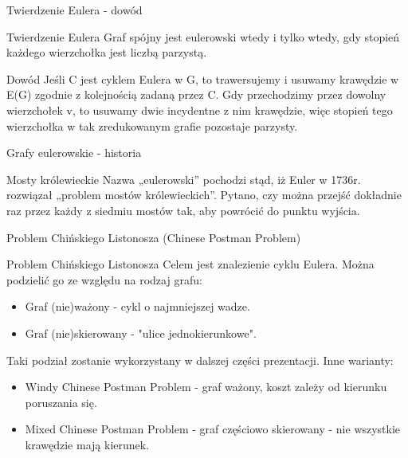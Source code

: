 \documentclass[polish,envcountsect,10pt]{beamer}
\begin{document}
\begin{frame}{Twierdzenie Eulera - dowód}
\begin{block}{Twierdzenie Eulera}
    Graf spójny jest eulerowski wtedy i tylko wtedy, gdy
    stopień każdego wierzchołka jest liczbą parzystą.
\end{block}
\begin{block}{Dowód}
    Jeśli C jest cyklem Eulera w G, to trawersujemy i usuwamy
    krawędzie w E(G) zgodnie z kolejnością zadaną przez C. Gdy przechodzimy
    przez dowolny wierzchołek v, to usuwamy dwie incydentne z nim krawędzie,
    więc stopień tego wierzchołka w tak zredukowanym grafie pozostaje
    parzysty.
\end{block}
\end{frame}

\begin{frame}{Grafy eulerowskie - historia}
    \begin{block}{Mosty królewieckie}
        Nazwa „eulerowski” pochodzi stąd, iż Euler w 1736r. rozwiązał „problem
        mostów królewieckich”. Pytano, czy można przejść dokładnie raz przez
        każdy z siedmiu mostów tak, aby powrócić do punktu wyjścia.
    \end{block}
\end{frame}

\begin{frame}{Problem Chińskiego Listonosza (Chinese Postman Problem)}
    \begin{block}{Problem Chińskiego Listonosza}
        Celem jest znalezienie cyklu Eulera.
        Można podzielić go ze względu na rodzaj grafu:
        \begin{itemize}
            \item Graf (nie)ważony - cykl o najmniejszej wadze.
            \item Graf (nie)skierowany - "ulice jednokierunkowe".
        \end{itemize}
        Taki podział zostanie wykorzystany w dalszej części prezentacji.
        Inne warianty:
        \begin{itemize}
            \item Windy Chinese Postman Problem - graf ważony, koszt zależy od kierunku poruszania się.
            \item Mixed Chinese Postman Problem - graf częściowo skierowany - nie wszystkie krawędzie mają kierunek.
        \end{itemize}
    \end{block}
\end{frame}
\end{document}

